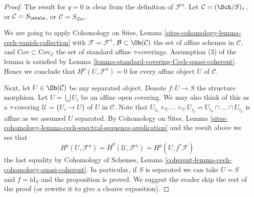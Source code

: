\begin{proof}
The result for $q = 0$ is clear from the definition of $\mathcal{F}^a$.
Let $\mathcal{C} = (\Sch/S)_\tau$, or $\mathcal{C} = S_\etale$,
or $\mathcal{C} = S_{Zar}$.

\medskip\noindent
We are going to apply
Cohomology on Sites,
Lemma \ref{sites-cohomology-lemma-cech-vanish-collection}
with $\mathcal{F} = \mathcal{F}^a$,
$\mathcal{B} \subset \Ob(\mathcal{C})$ the set of affine schemes
in $\mathcal{C}$, and $\text{Cov} \subset \text{Cov}_\mathcal{C}$ the
set of standard affine $\tau$-coverings. Assumption (3) of
the lemma is satisfied by
Lemma \ref{lemma-standard-covering-Cech-quasi-coherent}.
Hence we conclude that $H^p(U, \mathcal{F}^a) = 0$ for every
affine object $U$ of $\mathcal{C}$.

\medskip\noindent
Next, let $U \in \Ob(\mathcal{C})$ be any separated object.
Denote $f : U \to S$ the structure morphism.
Let $U = \bigcup U_i$ be an affine open covering.
We may also think of this as a $\tau$-covering
$\mathcal{U} = \{U_i \to U\}$ of $U$ in $\mathcal{C}$.
Note that
$U_{i_0} \times_U \ldots \times_U U_{i_p} =
U_{i_0} \cap \ldots \cap U_{i_p}$ is affine as we assumed $U$ separated.
By
Cohomology on Sites, Lemma
\ref{sites-cohomology-lemma-cech-spectral-sequence-application}
and the result above we see that
$$
H^p(U, \mathcal{F}^a) = \check{H}^p(\mathcal{U}, \mathcal{F}^a)
= H^p(U, f^*\mathcal{F})
$$
the last equality by
Cohomology of Schemes, Lemma
\ref{coherent-lemma-cech-cohomology-quasi-coherent}.
In particular, if $S$ is separated we can take $U = S$ and
$f = \text{id}_S$ and the proposition is proved.
We suggest the reader skip the rest of the proof (or rewrite it
to give a clearer exposition).


\end{proof}
